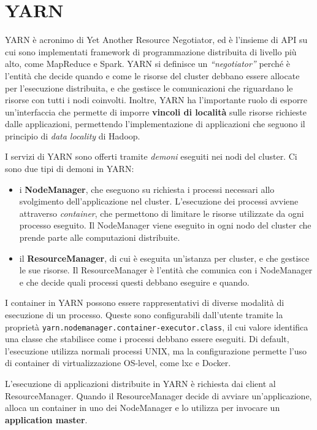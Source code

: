 \documentclass[italian,a4paper, twoside, 12pt]{report}
\begin{document}
\section{YARN}\label{yarn}

YARN è acronimo di Yet Another Resource Negotiator, ed è l'insieme di
API su cui sono implementati framework di programmazione distribuita di
livello più alto, come MapReduce e Spark. YARN si definisce un
\emph{``negotiator''} perché è l'entità che decide quando e come le
risorse del cluster debbano essere allocate per l'esecuzione
distribuita, e che gestisce le comunicazioni che riguardano le risorse
con tutti i nodi coinvolti. Inoltre, YARN ha l'importante ruolo di
esporre un'interfaccia che permette di imporre \textbf{vincoli di
località} sulle risorse richieste dalle applicazioni, permettendo
l'implementazione di applicazioni che seguono il principio di \emph{data
locality} di Hadoop.

I servizi di YARN sono offerti tramite \emph{demoni} eseguiti nei nodi
del cluster. Ci sono due tipi di demoni in YARN:

\begin{itemize}
\item
  i \textbf{NodeManager}, che eseguono su richiesta i processi necessari
  allo svolgimento dell'applicazione nel cluster. L'esecuzione dei
  processi avviene attraverso \emph{container}, che permettono di
  limitare le risorse utilizzate da ogni processo eseguito. Il
  NodeManager viene eseguito in ogni nodo del cluster che prende parte
  alle computazioni distribuite.
\item
  il \textbf{ResourceManager}, di cui è eseguita un'istanza per cluster,
  e che gestisce le sue risorse. Il ResourceManager è l'entità che
  comunica con i NodeManager e che decide quali processi questi debbano
  eseguire e quando.
\end{itemize}

I container in YARN possono essere rappresentativi di diverse modalità
di esecuzione di un processo. Queste sono configurabili dall'utente
tramite la proprietà
\lstinline!yarn.nodemanager.container-executor.class!, il cui valore
identifica una classe che stabilisce come i processi debbano essere
eseguiti. Di default, l'esecuzione utilizza normali processi UNIX, ma la
configurazione permette l'uso di container di virtualizzazione OS-level,
come lxc e Docker.

L'esecuzione di applicazioni distribuite in YARN è richiesta dai client
al ResourceManager. Quando il ResourceManager decide di avviare
un'applicazione, alloca un container in uno dei NodeManager e lo
utilizza per invocare un \textbf{application master}.
\end{document}
